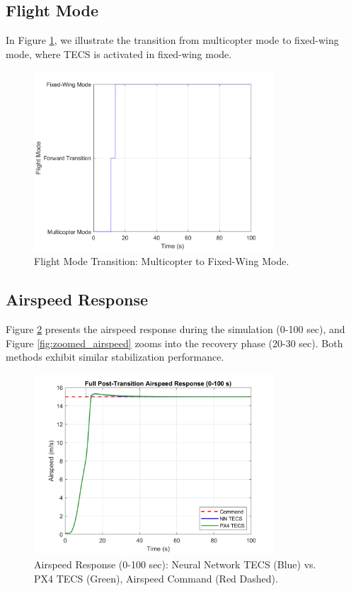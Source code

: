 \documentclass[journal,article,submit,pdftex,moreauthors]{Definitions/mdpi}
\begin{document}
\subsection{Flight Mode}
In Figure \ref{fig:flight_state}, we illustrate the transition from multicopter mode to fixed-wing mode, where TECS is activated in fixed-wing mode.

\begin{figure}[H]
    \centering
    \includegraphics[width=0.8\textwidth]{flight_state_plot.png}
    \caption{Flight Mode Transition: Multicopter to Fixed-Wing Mode.}
    \label{fig:flight_state}
\end{figure}

\subsection{Airspeed Response}
Figure \ref{fig:full_airspeed} presents the airspeed response during the simulation (0-100 sec), and Figure \ref{fig:zoomed_airspeed} zooms into the recovery phase (20-30 sec). Both methods exhibit similar stabilization performance.

\begin{figure}[H]
    \centering
    \includegraphics[width=0.8\textwidth]{full_airspeed_plot.png}
    \caption{Airspeed Response (0-100 sec): Neural Network TECS (Blue) vs. PX4 TECS (Green), Airspeed Command (Red Dashed).}
    \label{fig:full_airspeed}
\end{figure}
\end{document}
